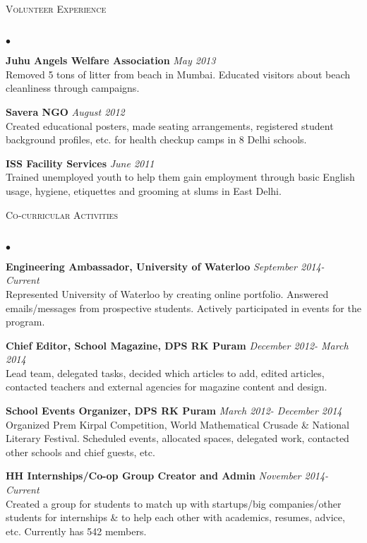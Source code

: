 \documentclass{article}
\newcommand{\lineunder}{\vspace*{-8pt} \\ \hspace*{-18pt} \hrulefill \\}
\newcommand{\header}[1]{{\hspace*{-15pt}\vspace*{6pt} \textsc{#1}} \vspace*{-6pt} \lineunder}
\newenvironment{achievements}{\begin{list}{$\bullet$}{\topsep 0pt \itemsep -1.5pt \leftmargin 5pt}}{\vspace*{4pt}\end{list}}
\begin{document}
\vspace{7pt}

\header{\normalsize Volunteer Experience}
\begin{achievements}
\item \textbf{Juhu Angels Welfare Association}   \hfill \textit{May 2013}
\\Removed 5 tons of litter from beach in Mumbai. Educated visitors about beach cleanliness through campaigns.
\item \textbf{Savera NGO}     \hfill \textit{August 2012}
\\Created educational posters, made seating arrangements, registered student background profiles, etc. for health checkup camps in 8 Delhi schools.
\item \textbf{ISS Facility Services}    \hfill \textit{June 2011}
\\Trained unemployed youth to help them gain employment through basic English usage, hygiene, etiquettes and grooming at slums in East Delhi.
\end{achievements}

\vspace{7pt}

\header{\normalsize Co-curricular Activities}
\begin{achievements}
\item \textbf{Engineering Ambassador, University of Waterloo} \hfill \textit {September 2014- Current}
\\ Represented University of Waterloo by creating online portfolio. Answered emails/messages from prospective students. Actively participated in events for the program.
\item \textbf{Chief Editor, School Magazine, DPS RK Puram} \hfill \textit {December 2012- March 2014}
\\ Lead team, delegated tasks, decided which articles to add, edited articles, contacted teachers and external agencies for magazine content and design.
\item \textbf{School Events Organizer, DPS RK Puram}  \hfill \textit {March 2012- December 2014}
\\ Organized Prem Kirpal Competition, World Mathematical Crusade \& National Literary Festival. Scheduled events, allocated spaces, delegated work, contacted other schools and chief guests, etc.
\item \textbf{HH Internships/Co-op Group Creator and Admin} \hfill \textit {November 2014- Current}
\\ Created a group for students to match up with startups/big companies/other students for internships \& to help each other with academics, resumes, advice, etc. Currently has 542 members.
\end{achievements}
\end{document}
